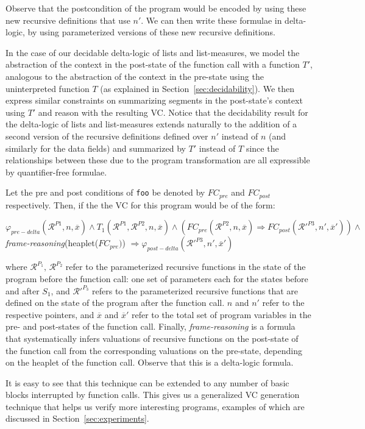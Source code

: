 Observe that the postcondition of the program would be encoded by using these new recursive definitions that use $n'$. We can then write these formulae in delta-logic, by using parameterized versions of these new recursive definitions.

In the case of our decidable delta-logic of lists and list-measures, we model the abstraction of the context in the post-state of the function call with a function $T'$, analogous to the abstraction of the context in the pre-state using the uninterpreted function $T$ (as explained in Section~\ref{sec:decidability}). We then express similar constraints on summarizing segments in the post-state's context using $T'$ and reason with the resulting VC. Notice that the decidability result for the delta-logic of lists and list-measures extends naturally to the addition of a second version of the recursive definitions defined over $n'$ instead of $n$ (and similarly for the data fields) and summarized by $T'$ instead of $T$ since the relationships between these due to the program transformation are all expressible by quantifier-free formulae. 

Let the pre and post conditions of \texttt{foo} be denoted by $FC_{pre}$ and $FC_{post}$ respectively. Then, if the the VC for this program would be of the form:\\
\begin{center}
 $\varphi_{pre-delta}(\mathcal{R}^{P1}, n, \overline{x}) \land{} T_1(\mathcal{R}^{P1},\mathcal{R}^{P2}, n, \overline{x}) \land{} \left(FC_{pre}(\mathcal{R}^{P2}, n, \overline{x}) \Rightarrow{} FC_{post}(\mathcal{R'}^{P3}, n', \overline{x}') \right) \land{}$ \textit{frame-reasoning}(heaplet($FC_{pre})$) $\Rightarrow{} \varphi_{post-delta}(\mathcal{R'}^{P3}, n', \overline{x}')$ 
\end{center}
where $\mathcal{R}^{P_1},\, \mathcal{R}^{P_2}$ refer to the parameterized recursive functions in the state of the program before the function call: one set of parameters each for the states before and after $S_1$, and $\mathcal{R'}^{P_3}$ refers to the parameterized recursive functions that are defined on the state of the program after the function call. $n$ and $n'$ refer to the respective pointers, and $\overline{x}$ and $\overline{x}'$ refer to the total set of program variables in the pre- and post-states of the function call. Finally, \textit{frame-reasoning} is a formula that systematically infers valuations of recursive functions on the post-state of the function call from the corresponding valuations on the pre-state, depending on the heaplet of the function call. Observe that this is a delta-logic formula.

It is easy to see that this technique can be extended to any number of basic blocks interrupted by function calls. This gives us a generalized VC generation technique that helps us verify more interesting programs, examples of which are discussed in Section~\ref{sec:experiments}.